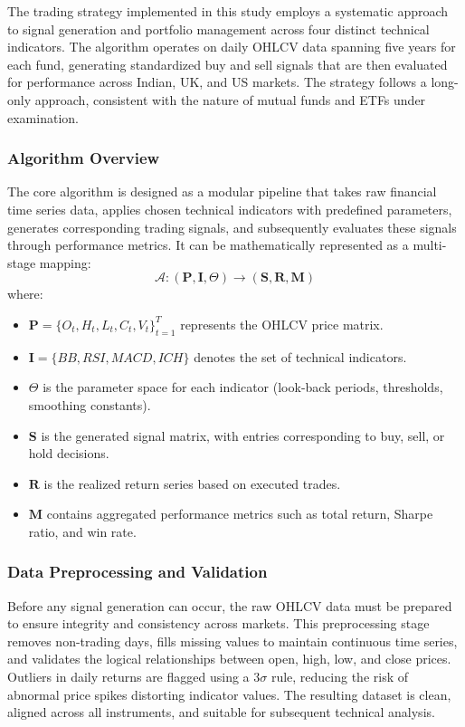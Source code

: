 The trading strategy implemented in this study employs a systematic approach to signal generation and portfolio management across four distinct technical indicators. The algorithm operates on daily OHLCV data spanning five years for each fund, generating standardized buy and sell signals that are then evaluated for performance across Indian, UK, and US markets. The strategy follows a long-only approach, consistent with the nature of mutual funds and ETFs under examination.

\subsubsection{Algorithm Overview}

The core algorithm is designed as a modular pipeline that takes raw financial time series data, applies chosen technical indicators with predefined parameters, generates corresponding trading signals, and subsequently evaluates these signals through performance metrics. It can be mathematically represented as a multi-stage mapping:
\[
\mathcal{A}: (\mathbf{P}, \mathbf{I}, \Theta) \rightarrow (\mathbf{S}, \mathbf{R}, \mathbf{M})
\]
where:
\begin{itemize}
    \item $\mathbf{P} = \{O_t, H_t, L_t, C_t, V_t\}_{t=1}^T$ represents the OHLCV price matrix.
    \item $\mathbf{I} = \{BB, RSI, MACD, ICH\}$ denotes the set of technical indicators.
    \item $\Theta$ is the parameter space for each indicator (look-back periods, thresholds, smoothing constants).
    \item $\mathbf{S}$ is the generated signal matrix, with entries corresponding to buy, sell, or hold decisions.
    \item $\mathbf{R}$ is the realized return series based on executed trades.
    \item $\mathbf{M}$ contains aggregated performance metrics such as total return, Sharpe ratio, and win rate.
\end{itemize}

\subsubsection{Data Preprocessing and Validation}

Before any signal generation can occur, the raw OHLCV data must be prepared to ensure integrity and consistency across markets. This preprocessing stage removes non-trading days, fills missing values to maintain continuous time series, and validates the logical relationships between open, high, low, and close prices. Outliers in daily returns are flagged using a $3\sigma$ rule, reducing the risk of abnormal price spikes distorting indicator values. The resulting dataset is clean, aligned across all instruments, and suitable for subsequent technical analysis.

